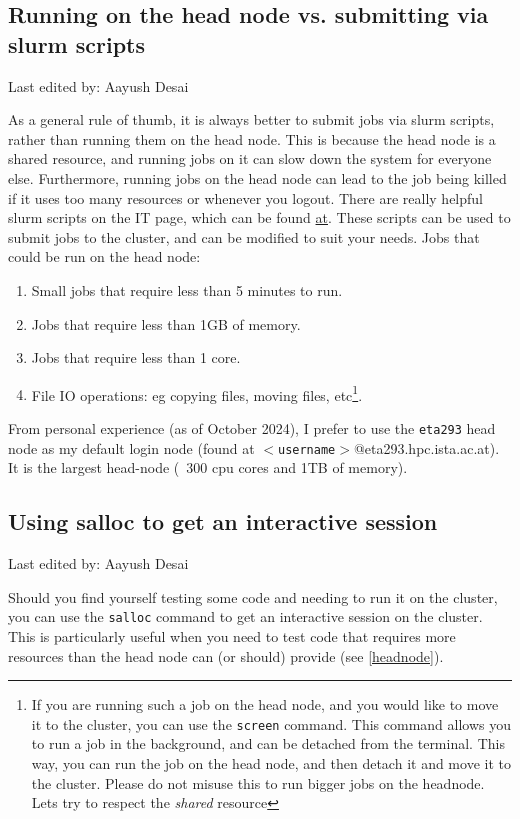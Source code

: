 \documentclass{article}
\newcommand{\setlasteditor}[1]{\gdef\lasteditor{#1}}
\newcommand{\lastedited}{%
    \vspace{1mm} {\footnotesize Last edited by: \lasteditor} \vspace{3mm}
    \newline

}
\begin{document}
\subsection{Running on the head node vs. submitting via slurm scripts \label{headnode}}
\setlasteditor{Aayush Desai}
\lastedited
\noindent
As a general rule of thumb, it is always better to submit jobs via slurm scripts, rather than running them on the head node. This is because the head node is a shared resource, and running jobs on it can slow down the system for everyone else. Furthermore, running jobs on the head node can lead to the job being killed if it uses too many resources or whenever you logout. 
\newline
\newline
There are really helpful slurm scripts on the IT page, which can be found \href{https://it.pages.ist.ac.at/docs/hpc-cluster/hpc-handbook/composing-a-slurm-script/}{at}. These scripts can be used to submit jobs to the cluster, and can be modified to suit your needs.
\newline
\newline
\noindent
Jobs that could be run on the head node:
\begin{enumerate}
    \item Small jobs that require less than 5 minutes to run.
    \item Jobs that require less than 1GB of memory.
    \item Jobs that require less than 1 core.
    \item File IO operations: eg copying files, moving files, etc\footnote{If you are running such a job on the head node, and you would like to move it to the cluster, you can use the \texttt{screen} command. This command allows you to run a job in the background, and can be detached from the terminal. This way, you can run the job on the head node, and then detach it and move it to the cluster. Please do not misuse this to run bigger jobs on the headnode. Lets try to respect the \textit{shared} resource}.
\end{enumerate}
\noindent
From personal experience (as of October 2024), I prefer to use the \texttt{eta293} head node as my default login node (found at \texttt{$<$username$>$}@eta293.hpc.ista.ac.at). It is the largest head-node (~300 cpu cores and 1TB of memory).


\subsection{Using salloc to get an interactive session}
\setlasteditor{Aayush Desai}
\lastedited
\noindent
Should you find yourself testing some code and needing to run it on the cluster, you can use the \texttt{salloc} command to get an interactive session on the cluster. This is particularly useful when you need to test code that requires more resources than the head node can (or should) provide (see \ref{headnode}).
\end{document}

